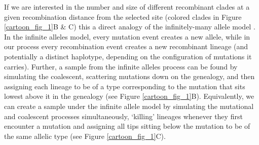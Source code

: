 \documentclass[a4paper,10pt]{article}
\begin{document}

If we are interested in the number and size of different recombinant clades at a given recombination distance from the selected site (colored clades in Figure \ref{cartoon_fig_1}B \& C)  this a direct analogy of the infinitely-many allele model \citep{}. In the infinite alleles model, every mutation event creates a new allele, while in our process every recombination event creates a new recombinant lineage (and potentially a distinct haplotype, depending on the configuration of mutations it carries). Further, a sample from the infinite alleles process can be found by simulating the coalescent, scattering mutations down on the genealogy, and then assigning each lineage to be of a type corresponding to the mutation that sits lowest above it in the genealogy (see Figure \ref{cartoon_fig_1}B). Equivalently, we can create a sample under the infinite allele model by simulating the mutational and coalescent processes simultaneously, `killing' lineages whenever they first encounter a mutation and assigning all tips sitting below the mutation to be of the same allelic type (see Figure \ref{cartoon_fig_1}C). 
\end{document}
